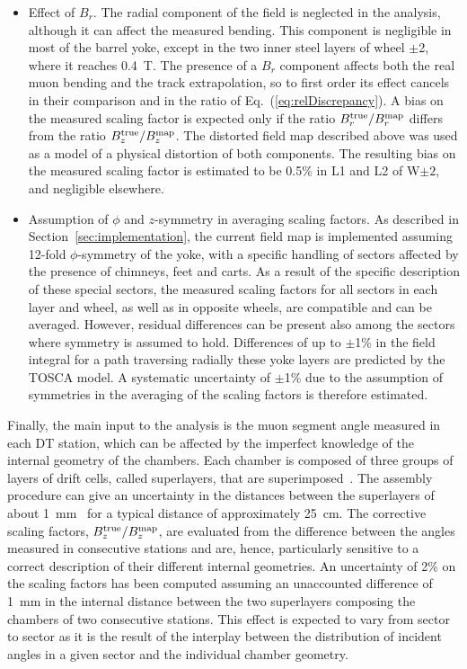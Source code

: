 \begin{itemize}
\item Effect of $B_r$. The radial component of the field is neglected
  in the analysis, although it can affect the measured bending. This
  component is negligible in most of the barrel yoke, except in the
  two inner steel layers of wheel $\pm$2, where it reaches 0.4~T.
  The presence of a $B_r$ component affects both the
  real muon bending and the track extrapolation, so to first
  order its effect cancels in their comparison and in the ratio of
  Eq.~(\ref{eq:relDiscrepancy}).
  A bias on the measured scaling
  factor is expected only if the ratio
  $B_r^{\rm true}/B_r^{\rm map}$ differs from the ratio
  $B_z^{\rm true}/B_z^{\rm map}$. The distorted field map described above was
  used as a model of a physical distortion of
  both components. The resulting bias on the measured scaling factor
  is estimated to be 0.5\% in L1 and L2 of W$\pm2$, and negligible elsewhere.

\item Assumption of $\phi$ and $z$-symmetry in averaging scaling
  factors.
  As described in Section~\ref{sec:implementation}, the current field map is
  implemented assuming 12-fold $\phi$-symmetry of the yoke, with
  a specific handling of sectors affected by the presence of
  chimneys, feet and carts. As a result of the specific description of
  these special sectors, the measured scaling factors
  for all sectors in each layer and wheel, as well as
  in opposite wheels, are compatible and can be averaged.
  However, residual differences can be present also among the sectors
  where symmetry is assumed to hold. Differences of up to
  $\pm$1\% in the field integral for a path traversing radially these yoke
  layers are predicted by the TOSCA model.
  A systematic uncertainty of $\pm$1\% due to the
  assumption of symmetries in the averaging of the scaling factors is
  therefore estimated.
\end{itemize}


Finally, the main input to the analysis is the muon segment angle measured
in each DT station, which can be affected by the imperfect knowledge of the
internal geometry of the chambers. Each chamber is composed of three groups
of layers of drift cells, called superlayers, that are superimposed~\cite{CMS}.
The assembly procedure can give an uncertainty  in the distances between
the superlayers of about 1~mm~\cite{PTDR1}
for a typical distance of approximately 25~cm.
The corrective scaling factors, $B_z^{\rm true}/B_z^{\rm map}$, are
evaluated from the difference between the angles measured in
consecutive stations and are, hence, particularly sensitive to a
correct description of their different internal geometries.
An uncertainty of 2\% on the scaling factors has been computed
assuming an unaccounted difference of 1~mm in the internal distance
between the two superlayers composing the chambers of two consecutive
stations.
This effect  is expected to vary from sector to sector as it is the result of
the interplay between the distribution of incident angles in a
given sector and the individual chamber geometry.

